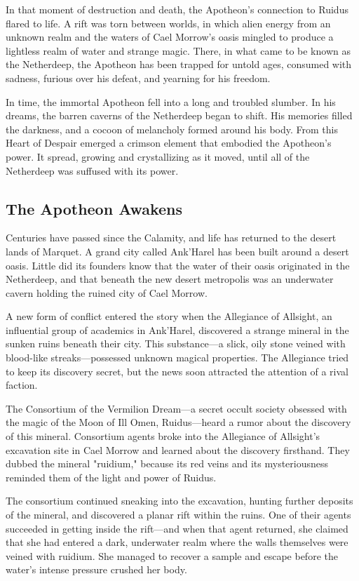 \documentclass[letterpaper, 11pt, bg=full, twocolumn]{dndbook}
\begin{document}
In that moment of destruction and death, the Apotheon's connection to Ruidus flared to life. A rift was torn between worlds, in which alien energy from an unknown realm and the waters of Cael Morrow's oasis mingled to produce a lightless realm of water and strange magic. There, in what came to be known as the Netherdeep, the Apotheon has been trapped for untold ages, consumed with sadness, furious over his defeat, and yearning for his freedom.

In time, the immortal Apotheon fell into a long and troubled slumber. In his dreams, the barren caverns of the Netherdeep began to shift. His memories filled the darkness, and a cocoon of melancholy formed around his body. From this Heart of Despair emerged a crimson element that embodied the Apotheon's power. It spread, growing and crystallizing as it moved, until all of the Netherdeep was suffused with its power.

\subsection{The Apotheon Awakens}

Centuries have passed since the Calamity, and life has returned to the desert lands of Marquet. A grand city called Ank'Harel has been built around a desert oasis. Little did its founders know that the water of their oasis originated in the Netherdeep, and that beneath the new desert metropolis was an underwater cavern holding the ruined city of Cael Morrow.

A new form of conflict entered the story when the Allegiance of Allsight, an influential group of academics in Ank'Harel, discovered a strange mineral in the sunken ruins beneath their city. This substance---a slick, oily stone veined with blood-like streaks---possessed unknown magical properties. The Allegiance tried to keep its discovery secret, but the news soon attracted the attention of a rival faction.

The Consortium of the Vermilion Dream---a secret occult society obsessed with the magic of the Moon of Ill Omen, Ruidus---heard a rumor about the discovery of this mineral. Consortium agents broke into the Allegiance of Allsight's excavation site in Cael Morrow and learned about the discovery firsthand. They dubbed the mineral "ruidium," because its red veins and its mysteriousness reminded them of the light and power of Ruidus.

The consortium continued sneaking into the excavation, hunting further deposits of the mineral, and discovered a planar rift within the ruins. One of their agents succeeded in getting inside the rift---and when that agent returned, she claimed that she had entered a dark, underwater realm where the walls themselves were veined with ruidium. She managed to recover a sample and escape before the water's intense pressure crushed her body.
\end{document}
